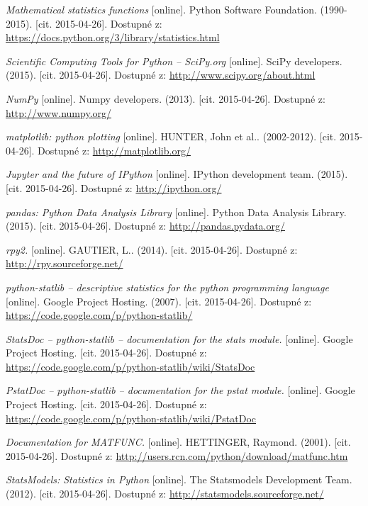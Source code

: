 \documentclass[thesis=B,czech]{FITthesis}[2012/06/26]
\begin{document}
\begin{thebibliography}{Per00}
\emph{Mathematical statistics functions} [online]. Python Software Foundation. (1990-2015). [cit. 2015-04-26]. Dostupné z: \url{https://docs.python.org/3/library/statistics.html}

\emph{Scientific Computing Tools for Python – SciPy.org} [online]. SciPy developers. (2015). [cit. 2015-04-26]. Dostupné z: \url{http://www.scipy.org/about.html}

\emph{NumPy} [online]. Numpy developers. (2013). [cit. 2015-04-26]. Dostupné z: \url{http://www.numpy.org/}

\emph{matplotlib: python plotting} [online]. HUNTER, John et al.. (2002-2012). [cit. 2015-04-26]. Dostupné z: \url{http://matplotlib.org/}

\emph{Jupyter and the future of IPython} [online]. IPython development team. (2015). [cit. 2015-04-26]. Dostupné z: \url{http://ipython.org/}

\emph{pandas: Python Data Analysis Library} [online]. Python Data Analysis Library. (2015). [cit. 2015-04-26]. Dostupné z: \url{http://pandas.pydata.org/}

\emph{rpy2.} [online]. GAUTIER, L.. (2014). [cit. 2015-04-26]. Dostupné z: \url{http://rpy.sourceforge.net/}

\emph{python-statlib – descriptive statistics for the python programming language} [online]. Google Project Hosting. (2007). [cit. 2015-04-26]. Dostupné z: \url{https://code.google.com/p/python-statlib/}

\emph{StatsDoc – python-statlib – documentation for the stats module.} [online]. Google Project Hosting. [cit. 2015-04-26]. Dostupné z: \url{https://code.google.com/p/python-statlib/wiki/StatsDoc}

\emph{PstatDoc – python-statlib – documentation for the pstat module.} [online]. Google Project Hosting. [cit. 2015-04-26]. Dostupné z: \url{https://code.google.com/p/python-statlib/wiki/PstatDoc}

\emph{Documentation for MATFUNC.} [online]. HETTINGER, Raymond. (2001). [cit. 2015-04-26]. Dostupné z: \url{http://users.rcn.com/python/download/matfunc.htm}

\emph{StatsModels: Statistics in Python} [online]. The Statsmodels Development Team. (2012). [cit. 2015-04-26]. Dostupné z: \url{http://statsmodels.sourceforge.net/}


\end{thebibliography}
\end{document}
